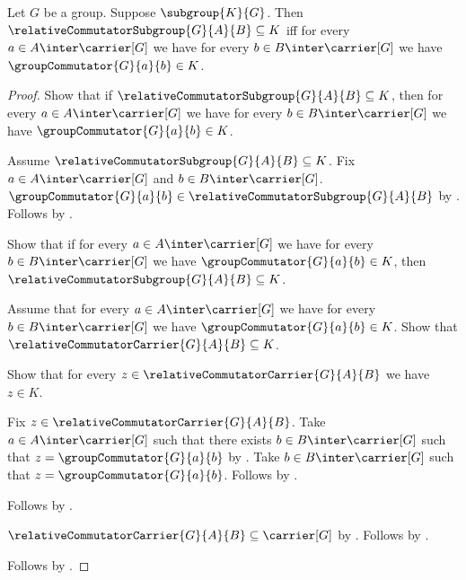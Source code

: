 \begin{theorem}\label{relative_commutator_subgroup_universal_property}
    Let $G$ be a group.
    Suppose $\subgroup{K}{G}$.
    Then
        $\relativeCommutatorSubgroup{G}{A}{B}\subseteq K$ iff
        for every $a\in A\inter\carrier[G]$ we have for every
        $b\in B\inter\carrier[G]$ we have
            $\groupCommutator{G}{a}{b}\in K$.
\end{theorem}
\begin{proof}
    Show that if
        $\relativeCommutatorSubgroup{G}{A}{B}\subseteq K$, then
        for every $a\in A\inter\carrier[G]$ we have for every
        $b\in B\inter\carrier[G]$ we have
            $\groupCommutator{G}{a}{b}\in K$.
    \begin{subproof}
        Assume $\relativeCommutatorSubgroup{G}{A}{B}\subseteq K$.
        Fix $a\in A\inter\carrier[G]$ and
            $b\in B\inter\carrier[G]$.
        $\groupCommutator{G}{a}{b}\in
            \relativeCommutatorSubgroup{G}{A}{B}$ by
            .
        Follows by .
    \end{subproof}
    Show that if for every $a\in A\inter\carrier[G]$ we have for every
        $b\in B\inter\carrier[G]$ we have
            $\groupCommutator{G}{a}{b}\in K$, then
        $\relativeCommutatorSubgroup{G}{A}{B}\subseteq K$.
    \begin{subproof}
        Assume that for every $a\in A\inter\carrier[G]$ we have for every
            $b\in B\inter\carrier[G]$ we have
                $\groupCommutator{G}{a}{b}\in K$.
        Show that $\relativeCommutatorCarrier{G}{A}{B}\subseteq K$.
        \begin{subproof}
            Show that for every
                $z\in\relativeCommutatorCarrier{G}{A}{B}$ we have
                $z\in K$.
            \begin{subproof}
                Fix $z\in\relativeCommutatorCarrier{G}{A}{B}$.
                Take $a\in A\inter\carrier[G]$ such that there exists
                    $b\in B\inter\carrier[G]$ such that
                    $z=\groupCommutator{G}{a}{b}$ by
                    .
                Take $b\in B\inter\carrier[G]$ such that
                    $z=\groupCommutator{G}{a}{b}$.
                Follows by \auto.
            \end{subproof}
            Follows by .
        \end{subproof}
        $\relativeCommutatorCarrier{G}{A}{B}\subseteq\carrier[G]$ by
            .
        Follows by
            .
    \end{subproof}
    Follows by \auto.
\end{proof}

